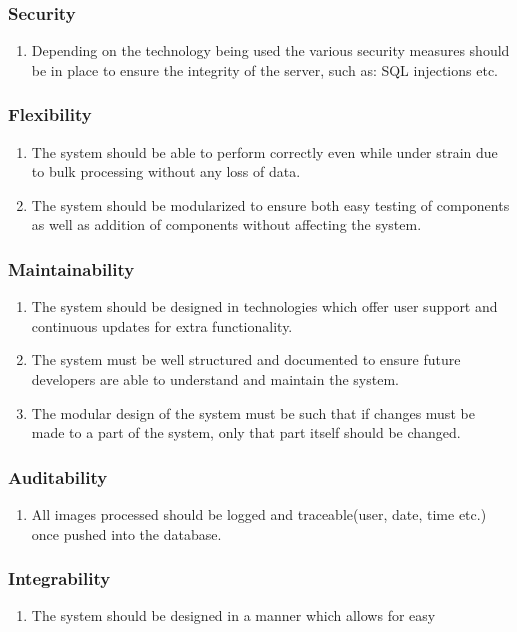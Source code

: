 \documentclass[a4paper,12pt]{report}
\begin{document}
\subsubsection{Security}
\begin{enumerate}
	\item Depending on the technology being used the various security measures should be in place to ensure the integrity of the server, such as: SQL injections etc.
\end{enumerate}
\subsubsection{Flexibility}
\begin{enumerate}
	\item The system should be able to perform correctly even while under strain due to bulk processing without any loss of data.
	\item The system should be modularized to ensure both easy testing of components as well as addition of components without affecting the system.
\end{enumerate}
\subsubsection{Maintainability}
\begin{enumerate}
	\item The system should be designed in technologies which offer user support and continuous updates for extra functionality.
	\item The system must be well structured and documented to ensure future developers are able to understand and maintain the system.
	\item The modular design of the system must be such that if changes must be made to a part of the system, only that part itself should be changed.
\end{enumerate}
\subsubsection{Auditability}
\begin{enumerate}
	\item All images processed should be logged and traceable(user, date, time etc.) once pushed into the database.
\end{enumerate}
\subsubsection{Integrability}
\begin{enumerate}
	\item The system should be designed in a manner which allows for easy 
\end{enumerate}
\end{document}

